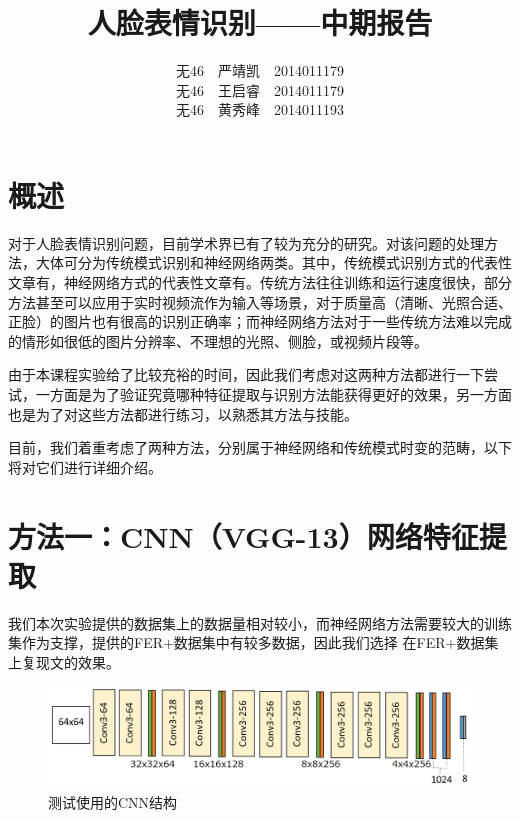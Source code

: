 \documentclass[UTF8]{ctexart}
\begin{document}
\title{人脸表情识别——中期报告}
\author{无46\ \ 严靖凯\ \ 2014011179\\ 无46\ \ 王启睿\ \ 2014011179\\ 无46\ \ 黄秀峰\ \ 2014011193}
\maketitle

\section{概述}


对于人脸表情识别问题，目前学术界已有了较为充分的研究。对该问题的处理方法，大体可分为传统模式识别和神经网络两类。其中，传统模式识别方式的代表性文章有\cite{}，神经网络方式的代表性文章有\cite{BarsoumICMI2016}。传统方法往往训练和运行速度很快，部分方法甚至可以应用于实时视频流作为输入等场景，对于质量高（清晰、光照合适、正脸）的图片也有很高的识别正确率；而神经网络方法对于一些传统方法难以完成的情形如很低的图片分辨率、不理想的光照、侧脸，或视频片段等。

由于本课程实验给了比较充裕的时间，因此我们考虑对这两种方法都进行一下尝试，一方面是为了验证究竟哪种特征提取与识别方法能获得更好的效果，另一方面也是为了对这些方法都进行练习，以熟悉其方法与技能。

目前，我们着重考虑了两种方法，分别属于神经网络和传统模式时变的范畴，以下将对它们进行详细介绍。

\section{方法一：CNN（VGG-13）网络特征提取} %


我们本次实验提供的数据集上的数据量相对较小，而神经网络方法需要较大的训练集作为支撑，\cite{BarsoumICMI2016}提供的FER+数据集中有较多数据，因此我们选择%
在FER+数据集上复现文\cite{BarsoumICMI2016}的效果。

\begin{figure}[ht]
\includegraphics[width=\textwidth]{ferplus.png}
\caption{测试使用的CNN结构}\label{fig:ferplus}
\end{figure}
\end{document}

